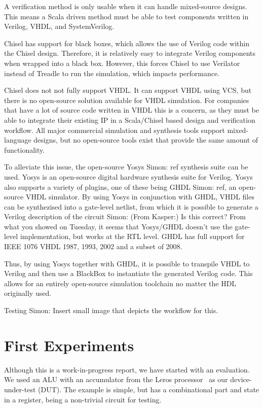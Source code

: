 \documentclass[conference]{IEEEtran}
\newcommand{\simon}[1]{{\color{green} Simon: #1}}
\begin{document}
A verification method is only usable when it can handle mixed-source designs.
This means a Scala driven method must be able to test components written in Verilog,
VHDL, and SystemVerilog.

Chisel has support for black boxes, which allows the use of Verilog code within the Chisel design.
Therefore, it is relatively easy to integrate Verilog components when wrapped into a black box.
However, this forces Chisel to use Verilator instead of Treadle to run the simulation, which impacts performance.

Chisel does not not fully support VHDL. It can support VHDL using VCS, but there is no
open-source solution available for VHDL simulation. For companies that have a lot of source code written in VHDL this is a concern, as they must be able to integrate their existing IP in a Scala/Chisel based design and verification workflow. All major commercial simulation and synthesis tools support mixed-language designs, but no open-source tools exist that provide the same amount of functionality.

To alleviate this issue, the open-source Yosys \simon{ref} synthesis suite can be used. Yosys is an open-source digital hardware synthesis suite for Verilog. Yosys also supports a variety of plugins, one of these being GHDL \simon{ref}, an open-source VHDL simulator. By using Yosys in conjunction with GHDL, VHDL files can be synthezised into a gate-level netlist, from which it is possible to generate a Verilog description of the circuit \simon{(From Kasper:) Is this correct? From what you showed on Tuesday, it seems that Yosys/GHDL doesn't use the gate-level implementation, but works at the RTL level}. GHDL has full support for IEEE 1076 VHDL 1987, 1993, 2002 and a subset of 2008.  

Thus, by using Yosys together with GHDL, it is possible to transpile VHDL to Verilog and then use a BlackBox to instantiate the generated Verilog code. This allows for an entirely open-source simulation toolchain no matter the HDL originally used.

Testing
\simon{Insert small image that depicts the workflow for this.}

\section{First Experiments}

Although this is a work-in-progress report, we have started with an evaluation.
We used an ALU with an accumulator from the Leros processor~\cite{leros:arcs2019}
as our device-under-test (DUT).
The example is simple, but has a combinational part and state in a register, being
a non-trivial circuit for testing.
\end{document}
